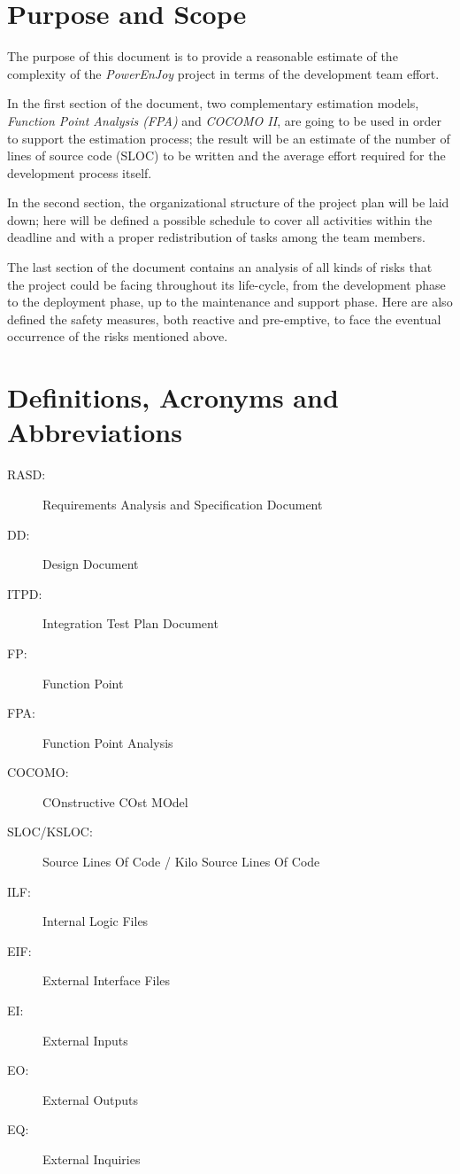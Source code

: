 \section{Purpose and Scope}
The purpose of this document is to provide a reasonable estimate of the complexity of the \textit{PowerEnJoy} project in terms of the development team effort.

In the first section of the document, two complementary estimation models, \textit{Function Point Analysis (FPA)} and \textit{COCOMO II}, are going to be used in order to support the estimation process; the result will be an estimate of the number of lines of source code (SLOC) to be written and the average effort required for the development process itself.

In the second section, the organizational structure of the project plan will be laid down; here will be defined a possible schedule to cover all activities within the deadline and with a proper redistribution of tasks among the team members.

The last section of the document contains an analysis of all kinds of risks that the project could be facing throughout its life-cycle, from the development phase to the deployment phase, up to the maintenance and support phase. Here are also defined the safety measures, both reactive and pre-emptive, to face the eventual occurrence of the risks mentioned above.

\section{Definitions, Acronyms and Abbreviations}
\begin{description}
\item[RASD:] Requirements Analysis and Specification Document
\item[DD:] Design Document
\item[ITPD:] Integration Test Plan Document
\item[FP:] Function Point
\item[FPA:] Function Point Analysis
\item[COCOMO:] COnstructive COst MOdel
\item[SLOC/KSLOC:] Source Lines Of Code / Kilo Source Lines Of Code
\item[ILF:] Internal Logic Files
\item[EIF:] External Interface Files
\item[EI:] External Inputs
\item[EO:] External Outputs
\item[EQ:] External Inquiries
\end{description}

